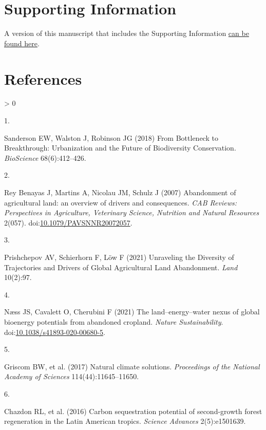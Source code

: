 \documentclass[9pt,twocolumn,twoside,]{pnas-new}
\newlength{\csllabelwidth}
\newlength{\cslhangindent}
\newenvironment{CSLReferences}[2] %
 {%
  \setlength{\parindent}{0pt}
  \ifodd #1 \everypar{\setlength{\hangindent}{\cslhangindent}}\ignorespaces\fi
  \ifnum #2 > 0
  \setlength{\parskip}{#2\baselineskip}
  \fi
 }%
 {}
\newcommand{\CSLLeftMargin}[1]{\parbox[t]{\csllabelwidth}{#1}}
\newcommand{\CSLRightInline}[1]{\parbox[t]{\linewidth - \csllabelwidth}{#1}\break}
\begin{document}
\hypertarget{supporting-information}{%
\section{Supporting Information}\label{supporting-information}}

A version of this manuscript that includes the Supporting Information
\href{https://drive.google.com/file/d/1Y_tnucb_Zia-4qE4-vc02s5hFuMHnIZ9/view?usp=sharing}{can
be found here}.

\newpage

\hypertarget{references}{%
\section{References}\label{references}}

\hypertarget{refs}{}
\begin{CSLReferences}{0}{0}
\leavevmode\hypertarget{ref-Sanderson2018}{}%
\CSLLeftMargin{1. }
\CSLRightInline{Sanderson EW, Walston J, Robinson JG (2018) {From
Bottleneck to Breakthrough: Urbanization and the Future of Biodiversity
Conservation}. \emph{BioScience} 68(6):412--426.}

\leavevmode\hypertarget{ref-ReyBenayas2007}{}%
\CSLLeftMargin{2. }
\CSLRightInline{Rey Benayas J, Martins A, Nicolau JM, Schulz J (2007)
{Abandonment of agricultural land: an overview of drivers and
consequences.} \emph{CAB Reviews: Perspectives in Agriculture,
Veterinary Science, Nutrition and Natural Resources} 2(057).
doi:\href{https://doi.org/10.1079/PAVSNNR20072057}{10.1079/PAVSNNR20072057}.}

\leavevmode\hypertarget{ref-Prishchepov2021}{}%
\CSLLeftMargin{3. }
\CSLRightInline{Prishchepov AV, Schierhorn F, Löw F (2021) {Unraveling
the Diversity of Trajectories and Drivers of Global Agricultural Land
Abandonment}. \emph{Land} 10(2):97.}

\leavevmode\hypertarget{ref-Naess2021}{}%
\CSLLeftMargin{4. }
\CSLRightInline{Næss JS, Cavalett O, Cherubini F (2021) {The
land--energy--water nexus of global bioenergy potentials from abandoned
cropland}. \emph{Nature Sustainability}.
doi:\href{https://doi.org/10.1038/s41893-020-00680-5}{10.1038/s41893-020-00680-5}.}

\leavevmode\hypertarget{ref-Griscom2017}{}%
\CSLLeftMargin{5. }
\CSLRightInline{Griscom BW, et al. (2017) {Natural climate solutions}.
\emph{Proceedings of the National Academy of Sciences}
114(44):11645--11650.}

\leavevmode\hypertarget{ref-Chazdon2016a}{}%
\CSLLeftMargin{6. }
\CSLRightInline{Chazdon RL, et al. (2016) {Carbon sequestration
potential of second-growth forest regeneration in the Latin American
tropics}. \emph{Science Advances} 2(5):e1501639.}


\end{CSLReferences}
\end{document}
